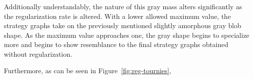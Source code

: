 Additionally understandably,
the nature of this gray mass alters significantly as the regularization rate is
altered.
%
With a lower allowed maximum value,
the strategy graphs take on the previously mentioned slightly amorphous gray
blob shape.
%
As the maximum value approaches one,
the gray shape begins to specialize more and begins to show resemblance to the
final strategy graphs obtained without regularization.




Furthermore,
as can be seen in Figure~\ref{fig:reg-tournies},

